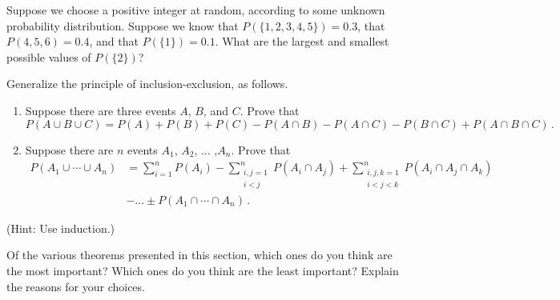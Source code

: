 \begin{problems}
    \item Suppose we choose a positive integer at random, according to some unknown probability distribution. Suppose
    we know that $P(\{1,2,3,4,5\})=0.3$, that $P({4,5,6})=0.4$, and that $P(\{1\})=0.1$. What are the largest and
    smallest possible values of $P(\{2\})$?
\end{problems}

\begin{challeges}
    \item     \label{challenge:1310} Generalize the principle of inclusion-exclusion, as follows.
    \begin{enumerate}
        \item Suppose there are three events $A$, $B$, and $C$. Prove that
        \begin{equation*}
            P(A \cup B \cup C) = P(A) + P(B) + P(C) - P(A \cap B) - P(A \cap C) - P(B\cap C)+ P(A \cap B \cap
            C)\,.
        \end{equation*}
        \item Suppose there are $n$ events $A_1$, $A_2$, $\ldots$ ,$A_n$. Prove that
        \begin{equation*}
            \begin{split}
                P(A_1 \cup \cdots \cup A_n) &= \sum_{i=1}^{n}P(A_i) - \sum_{\substack{i,j=1 \\ i<j}}^{n}P(A_i
                \cap
                A_j) +
                \sum_{\substack{i,j,k=1 \\ i < j < k}}^{n}P(A_i\cap A_j \cap A_k) \\
                &- \ldots \pm P(A_1 \cap \cdots \cap A_n)\,.
            \end{split}
        \end{equation*}
    \end{enumerate}
    (Hint: Use induction.)
\end{challeges}

\begin{discussion}
    \item Of the various theorems presented in this section, which ones do you think are the most important? Which
    ones do you think are the least important? Explain the reasons for your choices.
\end{discussion}